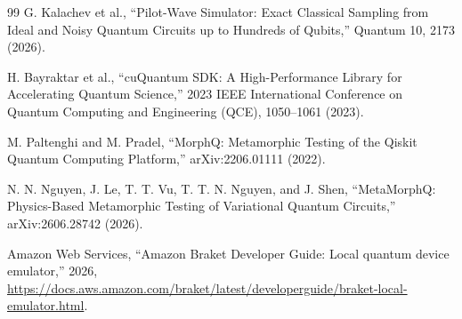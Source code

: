 \documentclass[10pt,twocolumn]{article}
\begin{document}
\begin{thebibliography}{99}
G. Kalachev et al., ``Pilot-Wave Simulator: Exact Classical Sampling from Ideal
and Noisy Quantum Circuits up to Hundreds of Qubits,'' Quantum 10, 2173 (2026).

H. Bayraktar et al., ``cuQuantum SDK: A High-Performance Library for
Accelerating Quantum Science,'' 2023 IEEE International Conference on Quantum
Computing and Engineering (QCE), 1050--1061 (2023).

M. Paltenghi and M. Pradel, ``MorphQ: Metamorphic Testing of the Qiskit
Quantum Computing Platform,'' arXiv:2206.01111 (2022).

N. N. Nguyen, J. Le, T. T. Vu, T. T. N. Nguyen, and J. Shen,
``MetaMorphQ: Physics-Based Metamorphic Testing of Variational Quantum
Circuits,'' arXiv:2606.28742 (2026).

Amazon Web Services, ``Amazon Braket Developer Guide: Local quantum device
emulator,'' 2026, \url{https://docs.aws.amazon.com/braket/latest/developerguide/braket-local-emulator.html}.

\end{thebibliography}
\end{document}
